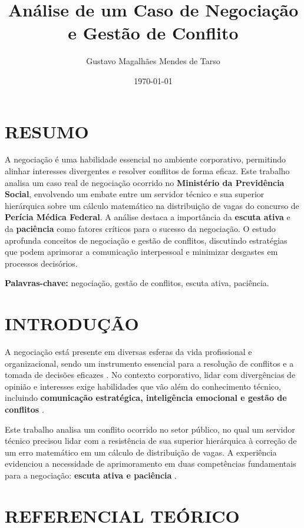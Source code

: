 \documentclass[article,12pt,oneside,a4paper]{article}
\author{Gustavo Magalhães Mendes de Tarso}
\date{\today}
\title{Análise de um Caso de Negociação e Gestão de Conflito}
\begin{document}
\maketitle
\section{RESUMO}
\label{sec:org4609a35}

A negociação é uma habilidade essencial no ambiente corporativo, permitindo alinhar interesses divergentes e resolver conflitos de forma eficaz. Este trabalho analisa um caso real de negociação ocorrido no \textbf{Ministério da Previdência Social}, envolvendo um embate entre um servidor técnico e sua superior hierárquica sobre um cálculo matemático na distribuição de vagas do concurso de \textbf{Perícia Médica Federal}. A análise destaca a importância da \textbf{escuta ativa} e da \textbf{paciência} como fatores críticos para o sucesso da negociação. O estudo aprofunda conceitos de negociação e gestão de conflitos, discutindo estratégias que podem aprimorar a comunicação interpessoal e minimizar desgastes em processos decisórios.

\textbf{Palavras-chave:} negociação, gestão de conflitos, escuta ativa, paciência.
\section{INTRODUÇÃO}
\label{sec:orgf7b3310}

A negociação está presente em diversas esferas da vida profissional e organizacional, sendo um instrumento essencial para a resolução de conflitos e a tomada de decisões eficazes \cite{fisher1991getting}. No contexto corporativo, lidar com divergências de opinião e interesses exige habilidades que vão além do conhecimento técnico, incluindo \textbf{comunicação estratégica, inteligência emocional e gestão de conflitos} \cite{goleman1998trabalhando}.

Este trabalho analisa um conflito ocorrido no setor público, no qual um servidor técnico precisou lidar com a resistência de sua superior hierárquica à correção de um erro matemático em um cálculo de distribuição de vagas. A experiência evidenciou a necessidade de aprimoramento em duas competências fundamentais para a negociação: \textbf{escuta ativa e paciência} \cite{ury1993como}.
\section{REFERENCIAL TEÓRICO}
\label{sec:orgd42c586}
\end{document}
